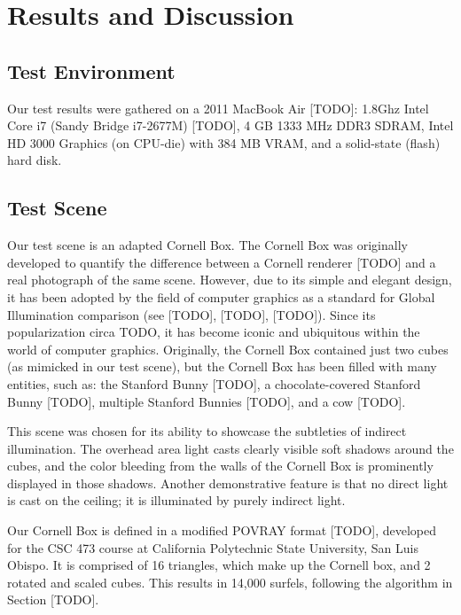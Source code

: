 \chapter{Results and Discussion}

\section{Test Environment}
Our test results were gathered on a 2011 MacBook Air [TODO]: 1.8Ghz Intel Core i7 (Sandy Bridge i7-2677M) [TODO], 4 GB 1333 MHz DDR3 SDRAM, Intel HD 3000 Graphics (on CPU-die) with 384 MB VRAM, and a solid-state (flash) hard disk.

\section{Test Scene}
Our test scene is an adapted Cornell Box. The Cornell Box was originally developed to quantify the difference between a Cornell renderer [TODO] and a real photograph of the same scene. However, due to its simple and elegant design, it has been adopted by the field of computer graphics as a standard for Global Illumination comparison (see [TODO], [TODO], [TODO]). Since its popularization circa TODO, it has become iconic and ubiquitous within the world of computer graphics. Originally, the Cornell Box contained just two cubes (as mimicked in our test scene), but the Cornell Box has been filled with many entities, such as: the Stanford Bunny [TODO], a chocolate-covered Stanford Bunny [TODO], multiple Stanford Bunnies [TODO], and a cow [TODO].

This scene was chosen for its ability to showcase the subtleties of indirect illumination. The overhead area light casts clearly visible soft shadows around the cubes, and the color bleeding from the walls of the Cornell Box is prominently displayed in those shadows. Another demonstrative feature is that no direct light is cast on the ceiling; it is illuminated by purely indirect light.

Our Cornell Box is defined in a modified POVRAY format [TODO], developed for the CSC 473 course at California Polytechnic State University, San Luis Obispo. It is comprised of 16 triangles, which make up the Cornell box, and 2 rotated and scaled cubes. This results in 14,000 surfels, following the algorithm in Section [TODO].

